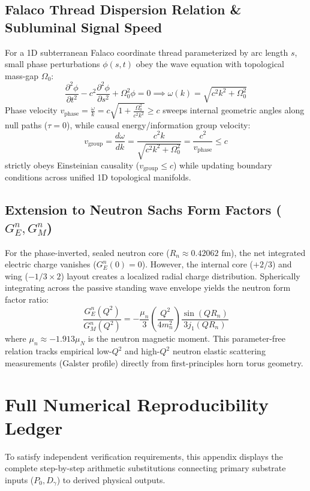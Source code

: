 \documentclass[11pt,a4paper]{article}
\begin{document}
	\subsection{Falaco Thread Dispersion Relation \& Subluminal Signal Speed}
	For a 1D subterranean Falaco coordinate thread parameterized by arc length $s$, small phase perturbations $\phi(s, t)$ obey the wave equation with topological mass-gap $\Omega_0$:
	\begin{equation}
		\frac{\partial^2 \phi}{\partial t^2} - c^2 \frac{\partial^2 \phi}{\partial s^2} + \Omega_0^2 \phi = 0 \implies \omega(k) = \sqrt{c^2 k^2 + \Omega_0^2}
	\end{equation}
	Phase velocity $v_{\text{phase}} = \frac{\omega}{k} = c \sqrt{1 + \frac{\Omega_0^2}{c^2 k^2}} \ge c$ sweeps internal geometric angles along null paths ($\tau = 0$), while causal energy/information group velocity:
	\begin{equation}
		v_{\text{group}} = \frac{d\omega}{dk} = \frac{c^2 k}{\sqrt{c^2 k^2 + \Omega_0^2}} = \frac{c^2}{v_{\text{phase}}} \le c
	\end{equation}
	strictly obeys Einsteinian causality ($v_{\text{group}} \le c$) while updating boundary conditions across unified 1D topological manifolds.
	
	\subsection{Extension to Neutron Sachs Form Factors ($G_E^n, G_M^n$)}
	For the phase-inverted, sealed neutron core ($R_n \approx 0.42062\text{ fm}$), the net integrated electric charge vanishes ($G_E^n(0) = 0$). However, the internal core ($+2/3$) and wing ($-1/3 \times 2$) layout creates a localized radial charge distribution. Spherically integrating across the passive standing wave envelope yields the neutron form factor ratio:
	\begin{equation}
		\frac{G_E^n(Q^2)}{G_M^n(Q^2)} = -\frac{\mu_n}{3} \left(\frac{Q^2}{4 m_n^2}\right) \frac{\sin(Q R_n)}{3 j_1(Q R_n)}
	\end{equation}
	where $\mu_n \approx -1.913 \mu_N$ is the neutron magnetic moment. This parameter-free relation tracks empirical low-$Q^2$ and high-$Q^2$ neutron elastic scattering measurements (Galster profile) directly from first-principles horn torus geometry.
	
	\appendix
	\section{Full Numerical Reproducibility Ledger}
	To satisfy independent verification requirements, this appendix displays the complete step-by-step arithmetic substitutions connecting primary substrate inputs ($P_0, D_\gamma$) to derived physical outputs.
	
\end{document}
